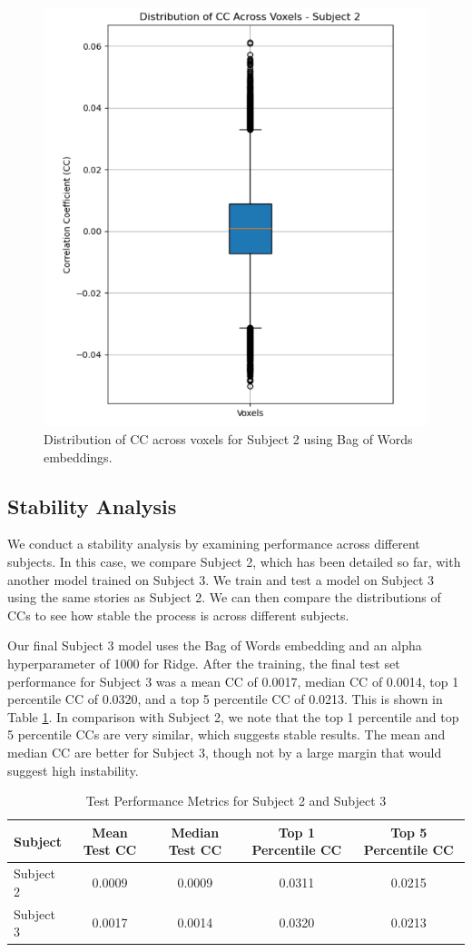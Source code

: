 \documentclass[10pt,letterpaper]{article}
\begin{document}
\begin{figure}
    \centering
    \includegraphics[width=0.5\linewidth]{figs/cc_dist_voxels_subject_2.png}
    \caption{Distribution of CC across voxels for Subject 2 using Bag of Words embeddings.}
    \label{fig:cc_dist_voxels_subject_2}
\end{figure}


\subsection{Stability Analysis}
We conduct a stability analysis by examining performance across different subjects. In this case, we compare Subject 2, which has been detailed so far, with another model trained on Subject 3. We train and test a model on Subject 3 using the same stories as Subject 2. We can then compare the distributions of CCs to see how stable the process is across different subjects.

Our final Subject 3 model uses the Bag of Words embedding and an alpha hyperparameter of 1000 for Ridge. After the training, the final test set performance for Subject 3 was a mean CC of 0.0017, median CC of 0.0014, top 1 percentile CC of 0.0320, and a top 5 percentile CC of 0.0213. This is shown in Table \ref{tab:subject_performance}. In comparison with Subject 2, we note that the top 1 percentile and top 5 percentile CCs are very similar, which suggests stable results. The mean and median CC are better for Subject 3, though not by a large margin that would suggest high instability.

\begin{table}[ht]
  \centering
  \caption{Test Performance Metrics for Subject 2 and Subject 3}
  \label{tab:subject_performance}
  \begin{tabular}{lcccc}
    \hline
    \textbf{Subject} & \textbf{Mean Test CC} & \textbf{Median Test CC} & \textbf{Top 1 Percentile CC} & \textbf{Top 5 Percentile CC} \\
    \hline
    Subject 2        & 0.0009                & 0.0009                 & 0.0311                     & 0.0215                      \\
    Subject 3        & 0.0017                & 0.0014                 & 0.0320                     & 0.0213                      \\
    \hline
  \end{tabular}
\end{table}
\end{document}
